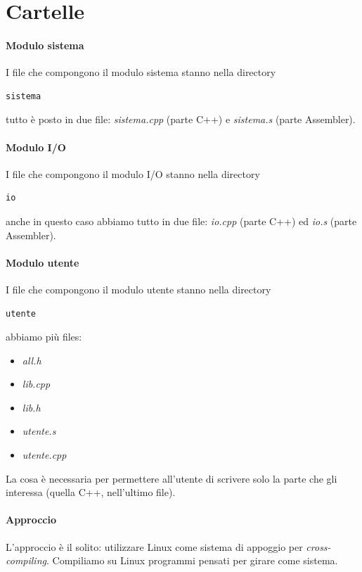 \documentclass[11pt]{report}
\theoremstyle{definition}
\begin{document}
\section{Cartelle}
\paragraph{Modulo sistema} I file che compongono il modulo sistema stanno nella directory 
\begin{verbatim}sistema\end{verbatim}
tutto è posto in due file: \emph{sistema.cpp} (parte C++) e \emph{sistema.s} (parte Assembler). 

\paragraph{Modulo I/O} I file che compongono il modulo I/O stanno nella directory
\begin{verbatim}io\end{verbatim}
anche in questo caso abbiamo tutto in due file: \emph{io.cpp} (parte C++) ed \emph{io.s} (parte Assembler).

\paragraph{Modulo utente} I file che compongono il modulo utente stanno nella directory
\begin{verbatim}utente\end{verbatim}
abbiamo più files: 
\begin{itemize}
\item \emph{all.h}
\item \emph{lib.cpp}
\item \emph{lib.h}
\item \emph{utente.s}
\item \emph{utente.cpp}
\end{itemize}
La cosa è necessaria per permettere all'utente di scrivere solo la parte che gli interessa (quella C++, nell'ultimo file). 

\paragraph{Approccio} L'approccio è il solito: utilizzare Linux come sistema di appoggio per \emph{cross-compiling}.  Compiliamo su Linux programmi pensati per girare come sistema. 
\end{document}
